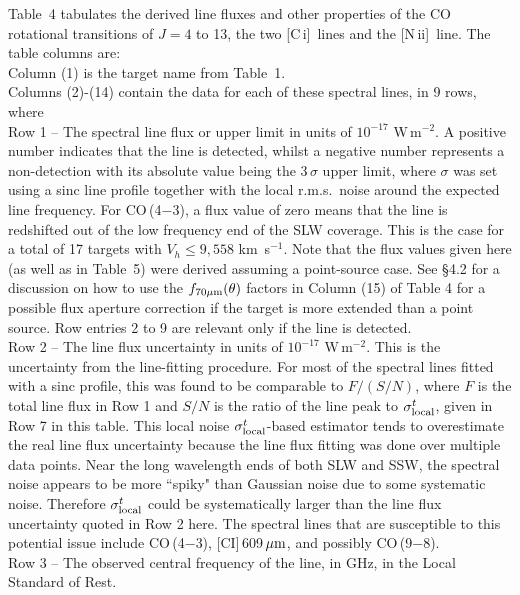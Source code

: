 \documentclass[preprint]{aastex}
\newcommand{\um}{\mbox{$\,\mu{\rm m}$}}
\newcommand{\kms}{\mbox{\,km~s$^{-1}$}}
\newcommand{\CI}{[C\,{\sc i}]}
\newcommand{\NII}{\mbox{[N\,{\sc ii}]}}
\begin{document}
Table~4 tabulates the derived line fluxes and other properties of the CO rotational transitions 
of $J =4$ to 13, the two \CI\ lines and the \NII\ line. The table columns are: \\
Column (1) is the target name from Table~1.\\
Columns (2)-(14) contain the data for each of these spectral lines, in 9 rows, where \\
Row  1 -- The spectral line flux or upper limit in units of $10^{-17}$ W\,m$^{-2}$. 
	    A positive number indicates that the line is detected, whilst a negative number 
	    represents a non-detection with its absolute value being the 3\,$\sigma$ upper 
	    limit, where $\sigma$ was set 
	    using a sinc line profile together with the local r.m.s.~noise around the expected 
	    line frequency.  For CO\,(4$-$3), a flux value of zero means that the line is 
            redshifted out of the low frequency end of the SLW coverage. This is the case for
	    a total of 17 targets with $V_h \le 9,558$\,\kms.
	    Note that the flux values given here (as well as in Table~5) were 
	    derived assuming a point-source case.  See \S4.2 for a discussion
            on how to use the $f_{70\mu{\rm m}}(\theta)$ factors in Column (15) of Table 4 for a possible
 	    flux aperture correction if the target is more extended than a point source.
            Row entries 2 to 9 are relevant only if the line is detected.\\
Row  2 -- The line flux uncertainty in units of $10^{-17}$ W\,m$^{-2}$.  This is the uncertainty 
	    from the line-fitting procedure.  For most of the spectral lines fitted with a sinc 
           profile, this was found to be comparable to $F/(S/N)$, where $F$ is the total line
	    flux in Row 1 and $S/N$ is the ratio of the line peak to $\sigma^t_{\rm local}$,  
	    given in Row 7 in this table.  This local noise $\sigma^t_{\rm local}$-based estimator 
          tends to overestimate the real line flux uncertainty because the line flux 
	    fitting was done over multiple data points.  Near the long wavelength ends
          of both SLW and SSW, the spectral noise appears to be more ``spiky" than Gaussian 
	    noise due to some systematic noise.
	    Therefore $\sigma^t_{\rm local}$ could be systematically larger than the line flux 
	    uncertainty quoted in Row 2 here.   The spectral lines that are susceptible to this 
	    potential issue include CO\,(4$-$3), [CI]\,609\um, and possibly CO\,(9$-$8).\\
Row  3 -- The observed central frequency of the line, in GHz, in the Local Standard of Rest.\\
\end{document}
